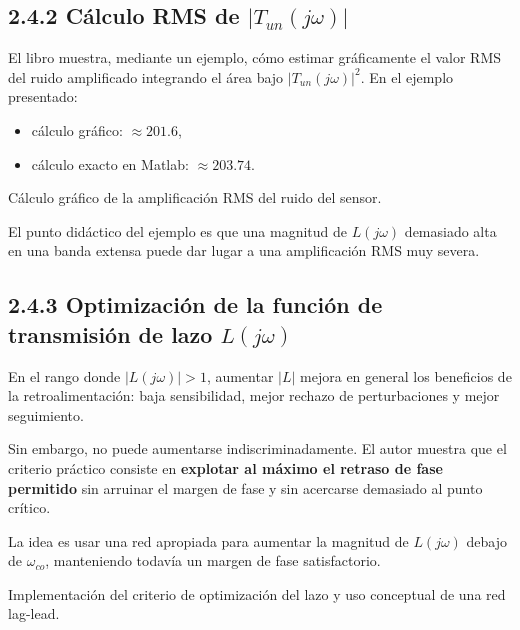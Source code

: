 \subsection{2.4.2 Cálculo RMS de \(|T_{un}(j\omega)|\)}
El libro muestra, mediante un ejemplo, cómo estimar gráficamente el valor RMS del ruido amplificado integrando el área bajo \(|T_{un}(j\omega)|^2\). En el ejemplo presentado:

\begin{itemize}
  \item cálculo gráfico: \(\approx 201.6\),
  \item cálculo exacto en Matlab: \(\approx 203.74\).
\end{itemize}

\begin{images}[\label{img:calculo-rms-ruido}]{Cálculo gráfico de la amplificación RMS del ruido del sensor.}
  \imagesnewline
\end{images}

El punto didáctico del ejemplo es que una magnitud de \(L(j\omega)\) demasiado alta en una banda extensa puede dar lugar a una amplificación RMS muy severa.

\subsection{2.4.3 Optimización de la función de transmisión de lazo \(L(j\omega)\)}
En el rango donde \(|L(j\omega)|>1\), aumentar \(|L|\) mejora en general los beneficios de la retroalimentación: baja sensibilidad, mejor rechazo de perturbaciones y mejor seguimiento.

Sin embargo, no puede aumentarse indiscriminadamente. El autor muestra que el criterio práctico consiste en \textbf{explotar al máximo el retraso de fase permitido} sin arruinar el margen de fase y sin acercarse demasiado al punto crítico.

La idea es usar una red apropiada para aumentar la magnitud de \(L(j\omega)\) debajo de \(\omega_{co}\), manteniendo todavía un margen de fase satisfactorio.

\begin{images}[\label{img:optimizacion-lazo-laglead}]{Implementación del criterio de optimización del lazo y uso conceptual de una red lag-lead.}
  \imagesnewline
\end{images}



